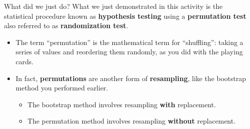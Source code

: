 \documentclass[
  ignorenonframetext,
]{beamer}
\providecommand{\tightlist}{%
  \setlength{\itemsep}{0pt}\setlength{\parskip}{0pt}}
\begin{document}
\begin{frame}{What did we just do?}
\protect\hypertarget{what-did-we-just-do}{}
What we just demonstrated in this activity is the statistical procedure
known as \textbf{hypothesis testing} using a \textbf{permutation test}
also referred to as \textbf{randomization test}.

\begin{itemize}
\item
  The term ``permutation'' is the mathematical term for ``shuffling'':
  taking a series of values and reordering them randomly, as you did
  with the playing cards.
\item
  In fact, \textbf{permutations} are another form of
  \textbf{resampling}, like the bootstrap method you performed earlier.

  \begin{itemize}
  \tightlist
  \item
    The bootstrap method involves resampling \textbf{with} replacement.
  \item
    The permutation method involves resampling \textbf{without}
    replacement.
  \end{itemize}
\end{itemize}
\end{frame}
\end{document}

